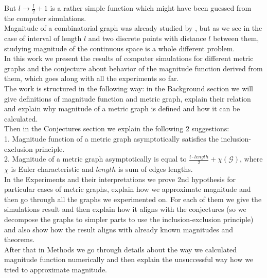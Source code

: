 \documentclass{article}
\begin{document}
But $l \rightarrow \frac{l}{2} + 1$ is a rather simple function which might have been guessed from the computer simulations. 
\\


Magnitude of a combinatorial graph was already studied by \textcite{LEINSTER_2017},
but as we see in the case of interval of length $l$ and two discrete points with 
distance $l$ between them, studying magnitude of the continuous space is a whole different problem.
\\

In this work we present the results of computer simulations for different metric
graphs and the conjecture about behavior of the magnitude function derived from them,
which goes along with all the experiments so far. 
\\

The work is structured in the following way: in the Background section we will 
give definitions of magnitude function and metric graph, explain their relation
and explain why magnitude of a metric graph is defined and how it can be calculated.
\\

Then in the Conjectures section we explain the following 2 suggestions:
\\

1. Magnitude function of a metric graph asymptotically satisfies the inclusion-exclusion principle. \\

2. Magnitude of a metric graph asymptotically is equal to $\frac{t \cdot length}{2} + \chi(\mathcal{G})$, where $\chi$ is Euler characteristic and $length$ is sum of edges lengths.
\\

In the Experiments and their interpretations we prove 2nd hypothesis for particular cases of metric graphs, 
explain how we approximate magnitude 
and then go through all the graphs we experimented on. For each of them we give the simulations 
result and then explain how it aligns with the conjectures (so we decompose the graphs to simpler 
parts to use the inclusion-exclusion principle) and also show how the result aligns with already 
known magnitudes and theorems. 
\\ 

After that in Methods we go through details about the way we calculated magnitude function 
numerically and then explain the unsuccessful way how we tried to approximate magnitude. 
\\
\end{document}
